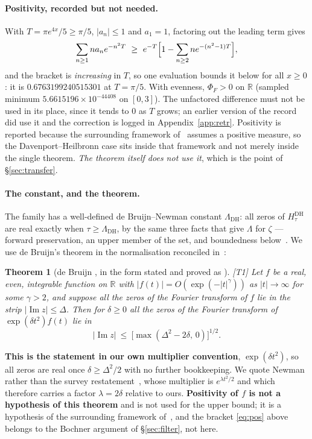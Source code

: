 \documentclass[11pt,a4paper]{article}
\newtheorem{theorem}{Theorem}
\theoremstyle{remark}
\newcommand{\tier}[1]{{\small\textsf{[#1]}}}
\newcommand{\LamDH}{\Lambda_{\mathrm{DH}}}
\newcommand{\PhiF}{\Phi_F}
\newcommand{\HDH}{H^{\mathrm{DH}}}
\begin{document}
\paragraph{Positivity, recorded but not needed.} With $T=\pi e^{4x}/5\ge\pi/5$,
$|a_n|\le1$ and $a_1=1$, factoring out the leading term gives
\begin{equation}\label{eq:pos}
  \sum_{n\ge1}na_ne^{-n^2T}\ \ge\ e^{-T}\Bigl[1-\sum_{n\ge2}ne^{-(n^2-1)T}\Bigr],
\end{equation}
and the bracket is \emph{increasing} in $T$, so one evaluation bounds it below for all
$x\ge0$: it is $0.6763199240515301$ at $T=\pi/5$. With evenness, $\PhiF>0$ on
$\mathbb R$ (sampled minimum $5.6615196\times10^{-44408}$ on $[0,3]$). The unfactored
difference must not be used in its place, since it tends to $0$ as $T$ grows; an earlier
version of the record did use it and the correction is logged in Appendix~\ref{app:retr}.
Positivity is reported because the surrounding framework of~\cite{NW} assumes a positive
measure, so the Davenport--Heilbronn case sits inside that framework and not merely inside
the single theorem. \emph{The theorem itself does not use it}, which is the point of
\S\ref{sec:transfer}.

\paragraph{The constant, and the theorem.} The family has a well-defined de Bruijn--Newman
constant $\LamDH$: all zeros of $\HDH_\tau$ are real exactly when $\tau\ge\LamDH$, by the
same three facts that give $\Lambda$ for $\zeta$ --- forward preservation, an upper member
of the set, and boundedness below~\cite{NW,Ne76}. We use de Bruijn's theorem in the
normalisation reconciled in~\cite[\S S]{audit}:

\begin{theorem}[de Bruijn {\cite[Thm.~13]{DB50}}, in the form stated and proved as
{\cite[Thm.~1]{Ne76}}]\label{thm:dB}
\tier{T1} Let $f$ be a real, even, integrable function on $\mathbb R$ with
$|f(t)|=O(\exp(-|t|^{\gamma}))$ as $|t|\to\infty$ for some $\gamma>2$, and suppose all the
zeros of the Fourier transform of $f$ lie in the strip $|\operatorname{Im}z|\le\Delta$. Then
for $\delta\ge0$ all the zeros of the Fourier transform of $\exp(\delta t^2)f(t)$ lie in
\[
  |\operatorname{Im}z|\ \le\ \bigl[\max(\Delta^2-2\delta,\,0)\bigr]^{1/2}.
\]
\end{theorem}

\noindent \textbf{This is the statement in our own multiplier convention}, $\exp(\delta
t^2)$, so all zeros are real once $\delta\ge\Delta^2/2$ with no further bookkeeping. We quote
Newman rather than the survey restatement~\cite[Thm.~7]{NW}, whose multiplier is
$e^{\lambda t^2/2}$ and which therefore carries a factor $\lambda=2\delta$ relative to ours.
\textbf{Positivity of $f$ is not a hypothesis of this theorem} and is not used for the upper
bound; it is a hypothesis of the surrounding framework of~\cite{NW}, and the bracket
\eqref{eq:pos} above belongs to the Bochner argument of \S\ref{sec:filter}, not here.
\end{document}
